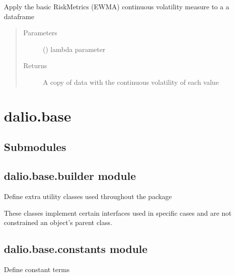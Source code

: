 \documentclass[letterpaper,10pt,english]{sphinxmanual}
\begin{document}
\begin{fulllineitems}
\label{\detokenize{dalio.ops:dalio.ops.risk_metrics}}
Apply the basic RiskMetrics (EWMA) continuous volatility measure to a
a dataframe
\begin{quote}\begin{description}
\item[{Parameters}] \leavevmode
{} () \textendash{} lambda parameter

\item[{Returns}] \leavevmode
A copy of data with the continuous volatility of each value

\end{description}\end{quote}

\end{fulllineitems}



\chapter{dalio.base}
\label{\detokenize{dalio.base:dalio-base}}\label{\detokenize{dalio.base::doc}}

\section{Submodules}
\label{\detokenize{dalio.base:submodules}}

\section{dalio.base.builder module}
\label{\detokenize{dalio.base:module-dalio.base.builder}}\label{\detokenize{dalio.base:dalio-base-builder-module}}
Define extra utility classes used throughout the package

These classes implement certain interfaces used in specific cases and are not
constrained an object’s parent class.


\section{dalio.base.constants module}
\label{\detokenize{dalio.base:module-dalio.base.constants}}\label{\detokenize{dalio.base:dalio-base-constants-module}}
Define constant terms
\end{document}
